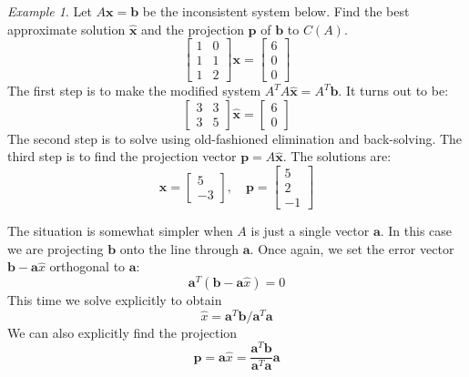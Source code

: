 \documentclass[11pt,oneside]{amsbook}
\theoremstyle{definition}
\theoremstyle{plain}
\theoremstyle{definition}
\theoremstyle{remark}
\newtheorem{example}[theorem]{Example}
\numberwithin{equation}{section}
\numberwithin{figure}{section}
\begin{document}
\begin{example}
  Let $A\mathbf{x}=\mathbf{b}$ be the inconsistent system below. Find the best approximate solution $\hat{\mathbf{x}}$ and the projection $\mathbf{p}$ of $\mathbf{b}$ to $C(A)$.
  \[\begin{bmatrix}1&0\\1&1\\1&2\end{bmatrix}\mathbf{x}
    =\begin{bmatrix}6\\0\\0\end{bmatrix}
  \]
  The first step is to make the modified system $A^TA\hat{\mathbf{x}}=A^T\mathbf{b}$. It turns out to be:
  \[\begin{bmatrix}3&3\\3&5\end{bmatrix}\hat{\mathbf{x}}
  =\begin{bmatrix}6\\0\end{bmatrix}
  \]
  The second step is to solve using old-fashioned elimination and back-solving. The third step is to find the projection vector $\mathbf{p}=A\hat{\mathbf{x}}$. The solutions are:
  \[\hat{\mathbf{x}}=\begin{bmatrix}5\\-3\end{bmatrix},\quad 
  \mathbf{p}=\begin{bmatrix}5\\2\\-1\end{bmatrix}
  \]
\end{example}

The situation is somewhat simpler when $A$ is just a single vector $\mathbf{a}$. In this case we are projecting $\mathbf{b}$ onto the line through $\mathbf{a}$. Once again, we set the error vector $\mathbf{b}-\mathbf{a}\hat x$ orthogonal to $\mathbf{a}$:
\[\mathbf{a}^T(\mathbf{b}-\mathbf{a}\hat{x})=0
\]
This time we solve explicitly to obtain
\[\hat x=\mathbf{a}^T\mathbf{b}/\mathbf{a}^T\mathbf{a}
\]
We can also explicitly find the projection
\[\mathbf{p}=\mathbf{a}\hat{x}
  =\frac{\mathbf{a}^T\mathbf{b}}{\mathbf{a}^T\mathbf{a}}\mathbf{a}
\]
\end{document}

